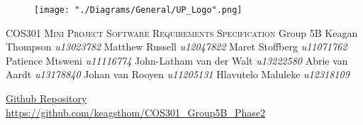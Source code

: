 \begin{titlepage}
\begin{center}
\begin{figure}[t]
\centering
\texttt{[image: "./Diagrams/General/UP\_Logo".png]}
\end{figure}
\begin{flushright}
\textsc{\LARGE COS301 Mini Project \newline\newline Software Requirements \newline   Specification}
\newline\newline \Large Group 5B \newline\newline
\large
Keagan Thompson    \emph{u13023782} \newline
Matthew Russell    \emph{u12047822} \newline
Maret Stoffberg    \emph{u11071762} \newline
Patience Mtsweni   \emph{u11116774} \newline
John-Latham van der Walt \emph{u13222580} \newline
Abrie van Aardt    \emph{u13178840} \newline
Johan van Rooyen   \emph{u11205131} \newline
Hlavutelo Maluleke \emph{u12318109} \newline
\end{flushright}
\vfill
\href{https://github.com/keagsthom/COS301_Group5B_Phase2}{Github Repository}\\
\url{https://github.com/keagsthom/COS301_Group5B_Phase2}
\end{center}
\end{titlepage}



